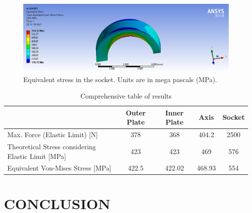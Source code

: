 \documentclass[a4paper 12pt]{article}
\begin{document}
\begin{figure}[!ht]
    \centering
    \includegraphics[width=1\textwidth]{images/SOCKET_STRESS.png}
    \caption{Equivalent stress in the socket. Units are in mega pascals (MPa).}
    \label{fig:socket_stress}
\end{figure}

\newpage
\begin{table}
\begin{center}
\begin{tabular}{|p{4cm}|c|c|c|c|}
\hline
  & \textbf{Outer Plate} & \textbf{Inner Plate} & \textbf{Axis} & \textbf{Socket} \\
\hline
Max. Force (Elastic Limit) [N] & 378 & 368 & 404.2 & 2500 \\
\hline
Theoretical Stress considering Elastic Limit [MPa] & 423 & 423 & 469 & 576 \\
\hline
Equivalent Von-Mises Stress [MPa] & 422.5 & 422.02 & 468.93 & 554 \\
\hline
\end{tabular}
\caption{Comprehensive table of results}
\label{table:results}
\end{center}
\end{table}



\section{CONCLUSION}

%
\end{document}
